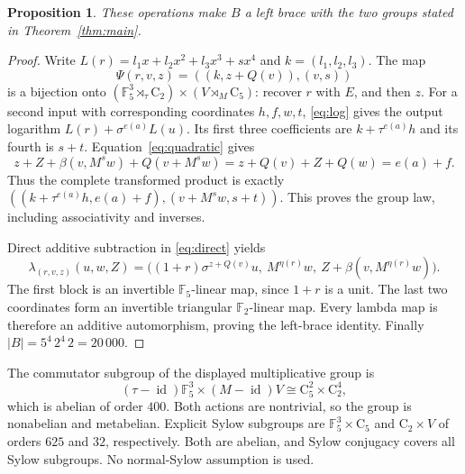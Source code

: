 \documentclass[11pt]{article}
\newtheorem{proposition}[theorem]{Proposition}
\newcommand{\F}{\mathbb F}
\newcommand{\C}{\mathrm C}
\newcommand{\id}{\operatorname{id}}
\begin{document}
\begin{proposition}\label{prop:brace}
These operations make $B$ a left brace with the two groups stated
in Theorem~\ref{thm:main}.
\end{proposition}
\begin{proof}
Write $L(r)=l_1x+l_2x^2+l_3x^3+s x^4$ and $k=(l_1,l_2,l_3)$.
The map
\[
 \Psi(r,v,z)=((k,z+Q(v)),(v,s))
\]
is a bijection onto
$(\F_5^3\rtimes_\tau\C_2)\times(V\rtimes_M\C_5)$:
recover $r$ with $E$, and then $z$.
For a second input with corresponding coordinates $h,f,w,t$,
\eqref{eq:log} gives the output logarithm $L(r)+\sigma^{e(a)}L(u)$.
Its first three coefficients are $k+\tau^{e(a)}h$ and its fourth is
$s+t$. Equation~\eqref{eq:quadratic} gives
\[
 z+Z+\beta(v,M^s w)+Q(v+M^s w)
       =z+Q(v)+Z+Q(w)=e(a)+f.
\]
Thus the complete transformed product is exactly
$((k+\tau^{e(a)}h,e(a)+f),(v+M^s w,s+t))$.
This proves the group law, including associativity and inverses.

Direct additive subtraction in \eqref{eq:direct} yields
\begin{equation}\label{eq:lambda}
 \lambda_{(r,v,z)}(u,w,Z)=
 \bigl((1+r)\sigma^{z+Q(v)}u,\
       M^{\eta(r)}w,\
       Z+\beta(v,M^{\eta(r)}w)\bigr).
\end{equation}
The first block is an invertible $\F_5$-linear map, since $1+r$ is
a unit. The last two coordinates form an invertible triangular
$\F_2$-linear map. Every lambda map is therefore an additive
automorphism, proving the left-brace identity.
Finally $|B|=5^4\,2^4\,2=20\,000$.
\end{proof}

The commutator subgroup of the displayed multiplicative group is
\[
 (\tau-\id)\F_5^3\times(M-\id)V
               \cong\C_5^2\times\C_2^4,
\]
which is abelian of order $400$. Both actions are nontrivial, so the
group is nonabelian and metabelian. Explicit Sylow subgroups are
$\F_5^3\times\C_5$ and $\C_2\times V$ of orders $625$ and $32$,
respectively. Both are abelian, and Sylow conjugacy covers all Sylow
subgroups. No normal-Sylow assumption is used.
\end{document}

